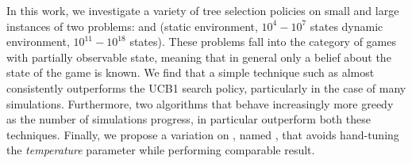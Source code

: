 In this work, we investigate a variety of tree selection policies on small and large instances of two problems: \rock and \poc (static environment, $10^4 - 10^7$ states \vs dynamic environment, $10^{11} - 10^{18}$ states). These problems fall into the category of games with partially observable state, meaning that in general only a belief about the state of the game is known. We find that a simple technique such as \egreedy almost consistently outperforms the UCB1 search policy, particularly in the case of many simulations. Furthermore, two algorithms that behave increasingly more greedy as the number of simulations progress, in particular \soft outperform both these techniques. Finally, we propose a variation on \soft, named \rsoft, that avoids hand-tuning the \emph{temperature} parameter while performing comparable result.